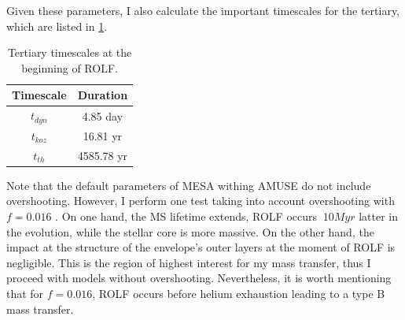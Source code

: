 Given these parameters, I also calculate the important timescales for the tertiary, which are listed in \cref{tab:tertiary_timescale_ROLF}.
\begin{table}[H]
    \centering
    \begin{tabular}{| c | c |}
       Timescale & Duration \\
       \hline
       $t_{dyn}$ & 4.85 day\\
       $t_{koz}$ & 16.81 yr\\
       $t_{th}$ & 4585.78 yr 
    \end{tabular}
    \caption{ Tertiary timescales at the beginning of ROLF.}
    \label{tab:tertiary_timescale_ROLF}
\end{table}

Note that the default parameters of MESA withing AMUSE do not include overshooting. However, I perform one test taking into account overshooting with $f=0.016$ \citep{herwig2000evolution}. On one hand, the MS lifetime extends, ROLF occurs $~10Myr$ latter in the evolution, while the stellar core is more massive. On the other hand, the impact at the structure of the envelope's outer layers at the moment of ROLF is negligible. This is the region of highest interest for my mass transfer, thus I proceed with models without overshooting. Nevertheless, it is worth mentioning that for $f=0.016$, ROLF occurs before helium exhaustion leading to a type B mass transfer.
